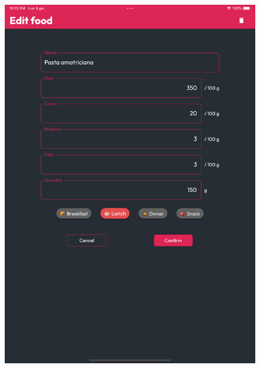 \documentclass{Configuration_Files/PoliMi3i_thesis}
\begin{document}
\begin{figure}[!h]
  \centering
  \includegraphics[scale=0.1]{Images/Screenshots/Tablet/EditFoodTablet.png}

\end{figure}
\end{document}

